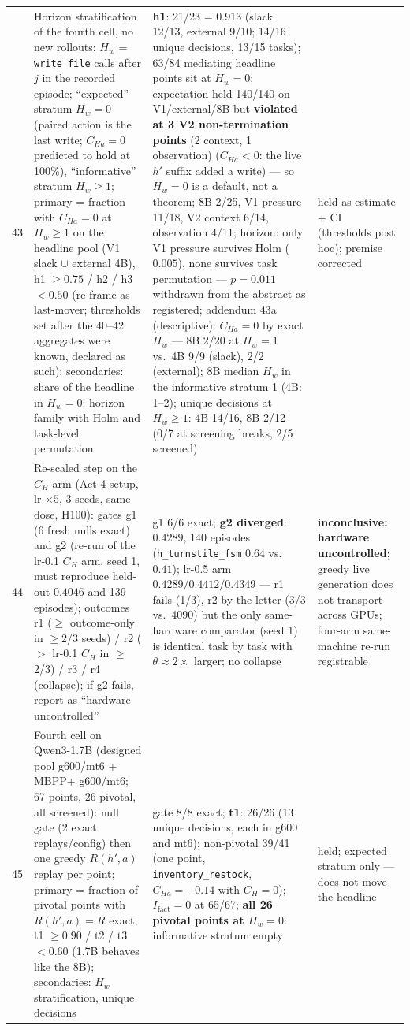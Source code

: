 \documentclass{article}
\theoremstyle{remark}
\begin{document}
\begin{table}[h]
{\begin{tabular}{clll}
43 & Horizon stratification of the fourth cell, no new rollouts: $H_w$ = \texttt{write\_file} calls after $j$ in the recorded episode; ``expected'' stratum $H_w = 0$ (paired action is the last write; $C_{Ha}=0$ predicted to hold at 100\%), ``informative'' stratum $H_w \geq 1$; primary = fraction with $C_{Ha}=0$ at $H_w \geq 1$ on the headline pool (V1 slack $\cup$ external 4B), h1 $\geq 0.75$ / h2 / h3 $<0.50$ (re-frame as last-mover; thresholds set after the 40--42 aggregates were known, declared as such); secondaries: share of the headline in $H_w = 0$; horizon family with Holm and task-level permutation & \textbf{h1}: 21/23 = 0.913 (slack 12/13, external 9/10; 14/16 unique decisions, 13/15 tasks); 63/84 mediating headline points sit at $H_w = 0$; expectation held 140/140 on V1/external/8B but \textbf{violated at 3 V2 non-termination points} (2 context, 1 observation) ($C_{Ha} < 0$: the live $h'$ suffix added a write) --- so $H_w = 0$ is a default, not a theorem; 8B 2/25, V1 pressure 11/18, V2 context 6/14, observation 4/11; horizon: only V1 pressure survives Holm ($0.005$), none survives task permutation --- $p = 0.011$ withdrawn from the abstract as registered; addendum 43a (descriptive): $C_{Ha}=0$ by exact $H_w$ --- 8B 2/20 at $H_w=1$ vs.\ 4B 9/9 (slack), 2/2 (external); 8B median $H_w$ in the informative stratum 1 (4B: 1--2); unique decisions at $H_w\geq1$: 4B 14/16, 8B 2/12 (0/7 at screening breaks, 2/5 screened) & held as estimate + CI (thresholds post hoc); premise corrected \\
44 & Re-scaled step on the $C_H$ arm (Act-4 setup, lr $\times 5$, 3 seeds, same dose, H100): gates g1 (6 fresh nulls exact) and g2 (re-run of the lr-0.1 $C_H$ arm, seed 1, must reproduce held-out $0.4046$ and 139 episodes); outcomes r1 ($\geq$ outcome-only in $\geq$2/3 seeds) / r2 ($>$ lr-0.1 $C_H$ in $\geq$2/3) / r3 / r4 (collapse); if g2 fails, report as ``hardware uncontrolled'' & g1 6/6 exact; \textbf{g2 diverged}: $0.4289$, 140 episodes (\texttt{h\_turnstile\_fsm} $0.64$ vs.\ $0.41$); lr-0.5 arm $0.4289 / 0.4412 / 0.4349$ --- r1 fails (1/3), r2 by the letter (3/3 vs.\ 4090) but the only same-hardware comparator (seed 1) is identical task by task with $\theta \approx 2\times$ larger; no collapse & \textbf{inconclusive: hardware uncontrolled}; greedy live generation does not transport across GPUs; four-arm same-machine re-run registrable \\
45 & Fourth cell on Qwen3-1.7B (designed pool g600/mt6 + MBPP+ g600/mt6; 67 points, 26 pivotal, all screened): null gate (2 exact replays/config) then one greedy $R(h',a)$ replay per point; primary = fraction of pivotal points with $R(h',a) = R$ exact, t1 $\geq 0.90$ / t2 / t3 $< 0.60$ (1.7B behaves like the 8B); secondaries: $H_w$ stratification, unique decisions & gate 8/8 exact; \textbf{t1}: 26/26 (13 unique decisions, each in g600 and mt6); non-pivotal 39/41 (one point, \texttt{inventory\_restock}, $C_{Ha} = -0.14$ with $C_H = 0$); $I_{\text{fact}} = 0$ at 65/67; \textbf{all 26 pivotal points at $H_w = 0$}: informative stratum empty & held; expected stratum only --- does not move the headline \\

\end{tabular}}
\end{table}
\end{document}
